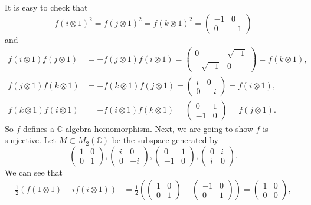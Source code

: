 \documentclass[a4paper, 12pt]{article}
\begin{document}
\begin{solution}
It is easy to check that 
\[f(i\otimes 1)^2=f(j\otimes 1)^2=f(k\otimes 1)^2=\begin{pmatrix}
	-1&0\\
	0&-1
\end{pmatrix}\]
and 
\begin{align*}
	f(i\otimes 1)f(j\otimes 1)&=-f(j\otimes 1)f(i\otimes 1)=\begin{pmatrix}
		0&\sqrt{-1}\\ 
		-\sqrt{-1}&0
	\end{pmatrix}=f(k\otimes 1),\\[5pt] 
	f(j\otimes 1)f(k\otimes 1)&=-f(k\otimes 1)f(j\otimes 1)=\begin{pmatrix}
		i&0\\ 
		0&-i
	\end{pmatrix}=f(i\otimes 1),\\[5pt] 
	f(k\otimes 1)f(i\otimes 1)&=-f(i\otimes 1)f(k\otimes 1)=\begin{pmatrix}
		0&1\\ 
		-1&0
	\end{pmatrix}=f(j\otimes 1). 
\end{align*}
So \(f\) defines a \(\mathbb{C}\)-algebra homomorphism. Next, we are going to show \(f\) is surjective. Let \(M\subset M_2(\mathbb{C})\) be the subspace generated by 
\[\begin{pmatrix}
	1&0\\ 
	0&1
\end{pmatrix},\begin{pmatrix}
	i&0\\ 
	0&-i
\end{pmatrix},\begin{pmatrix}
	0&1\\ 
	-1&0
\end{pmatrix},\begin{pmatrix}
	0&i\\ 
	i&0
\end{pmatrix}.\]
We can see that 
\begin{align*}
	\frac{1}{2}(f(1\otimes 1)-if(i\otimes 1))&=\frac{1}{2}(\begin{pmatrix}
		1&0\\ 
		0&1
	\end{pmatrix}-\begin{pmatrix}
		-1&0\\ 
		0&1
	\end{pmatrix})=\begin{pmatrix}
		1&0\\
		0&0
	\end{pmatrix},\\[5pt] 

\end{align*}
\end{solution}
\end{document}
